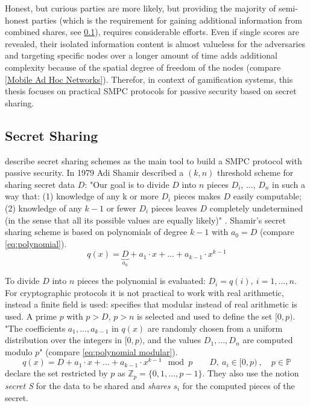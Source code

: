 		Honest, but curious parties are more likely, but providing the majority of semi-honest parties (which is the requirement for gaining additional information from combined shares, see \ref{Secret Sharing}), requires considerable efforts. Even if single scores are revealed, their isolated information content is almost valueless for the adversaries and targeting specific nodes over a longer amount of time adds additional complexity because of the spatial degree of freedom of the nodes (compare \ref{Mobile Ad Hoc Networks}).
		Therefor, in context of gamification systems, this thesis focuses on practical \gls{SMPC} protocols for passive security based on secret sharing.

		\subsection{Secret Sharing}	\label{Secret Sharing}
		
		\textcite[p. 32]{Cramer2015} describe secret sharing schemes as the main tool to build a \gls{SMPC} protocol with passive security. In 1979 Adi Shamir described a $(k, n)$ threshold scheme for sharing secret data $D$: "Our goal is to divide $D$ into $n$ pieces $D_i$, ..., $D_n$ in such a way that:
		(1) knowledge of any k or more $D_i$ pieces makes $D$ easily computable; (2) knowledge of any $k-1$ or fewer $D_i$ pieces leaves $D$ completely undetermined (in the sense that all its possible values are equally likely)" \autocite{Shamir1979}.
		Shamir's secret sharing scheme is based on polynomials of degree $k-1$ with $a_0=D$ (compare \ref{eq:polynomial}). 
		\begin{equation}
		\label{eq:polynomial}
		q(x)=\underbrace{D}_{a_0} + a_1 \cdot x + ... + a_{k-1} \cdot x^{k-1}
		\end{equation}
		
		To divide $D$ into $n$ pieces the polynomial is evaluated: $D_i=q(i),\ i=1,...,n$. For cryptographic protocols it is not practical to work with real arithmetic, instead a finite field is used: \textcite{Shamir1979} specifies that modular instead of real arithmetic is used. A prime $p$ with $p>D$, $p>n$ is selected and used to define the set $[0, p)$. "The coefficients $a_1, ..., a_{k-1}$ in $q(x)$ are randomly chosen	from a uniform distribution over the integers in $[0, p)$, and the values $D_1, ..., D_n$ are computed modulo $p$" \autocite[p. 613]{Shamir1979} (compare \ref{eq:polynomial modular}).
		\begin{equation}
		\label{eq:polynomial modular}
		q(x) = D + a_1 \cdot x + ... + a_{k-1} \cdot x^{k-1} \mod p \qquad D,\ a_i \in [0,p)\ , \quad p \in \mathbb{P}
		\end{equation}
		\textcite[p. 7]{Cramer2015} declare the set restricted by $p$ as $\mathbb{Z}_p = \{0, 1, ..., p-1\}$. They also use the notion \textit{secret S} for the data to be shared and \textit{shares $s_i$} for the computed pieces of the secret.
		
